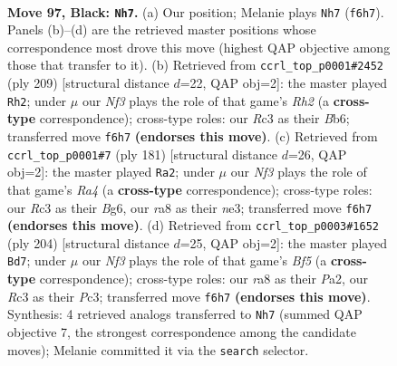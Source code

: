 \documentclass[11pt]{article}
\begin{document}
\clearpage

\begin{figure}[p]\centering
\begin{subfigure}{0.46\textwidth}\centering
\resizebox{\linewidth}{!}{%
\newchessgame
\chessboard[
  setfen={R7/8/1K3n1p/4p3/3p2kb/2r5/8/8 b - - 13 97},
  showmover=false,
  pgfstyle=straightmove, color=movearrow, markmove={f6-h7}
]}
\caption{}
\end{subfigure}\hfill
\begin{subfigure}{0.46\textwidth}\centering
\resizebox{\linewidth}{!}{%
\newchessgame
\chessboard[
  setfen={8/p5kr/1b2B3/8/4K3/8/8/5R2 b - - 5 105},
  showmover=false,
  pgfstyle=straightmove, color=movearrow, markmove={h7-h2}
]}
\caption{}
\end{subfigure}
\\[4pt]
\begin{subfigure}{0.46\textwidth}\centering
\resizebox{\linewidth}{!}{%
\newchessgame
\chessboard[
  setfen={8/5p2/6b1/rk6/8/4N3/8/2R3K1 b - - 5 91},
  showmover=false,
  pgfstyle=straightmove, color=movearrow, markmove={a5-a2}
]}
\caption{}
\end{subfigure}\hfill
\begin{subfigure}{0.46\textwidth}\centering
\resizebox{\linewidth}{!}{%
\newchessgame
\chessboard[
  setfen={8/2n5/8/p1k2B2/8/2P5/P1K5/8 w - - 79 103},
  showmover=false,
  pgfstyle=straightmove, color=movearrow, markmove={f5-d7}
]}
\caption{}
\end{subfigure}
\caption{\textbf{Move 97, Black: \texttt{Nh7}.} (a) Our position; Melanie plays \texttt{Nh7} (\texttt{f6h7}). Panels (b)--(d) are the retrieved master positions whose correspondence most drove this move (highest QAP objective among those that transfer to it). (b) Retrieved from \texttt{ccrl\_top\_p0001\#2452} (ply 209) [structural distance $d$=22, QAP obj=2]: the master played \texttt{Rh2}; under $\mu$ our \emph{Nf3} plays the role of that game's \emph{Rh2} (a \textbf{cross-type} correspondence); cross-type roles: our \emph{R}c3 as their \emph{B}b6; transferred move \texttt{f6h7} \textbf{(endorses this move)}. (c) Retrieved from \texttt{ccrl\_top\_p0001\#7} (ply 181) [structural distance $d$=26, QAP obj=2]: the master played \texttt{Ra2}; under $\mu$ our \emph{Nf3} plays the role of that game's \emph{Ra4} (a \textbf{cross-type} correspondence); cross-type roles: our \emph{R}c3 as their \emph{B}g6, our \emph{r}a8 as their \emph{n}e3; transferred move \texttt{f6h7} \textbf{(endorses this move)}. (d) Retrieved from \texttt{ccrl\_top\_p0003\#1652} (ply 204) [structural distance $d$=25, QAP obj=2]: the master played \texttt{Bd7}; under $\mu$ our \emph{Nf3} plays the role of that game's \emph{Bf5} (a \textbf{cross-type} correspondence); cross-type roles: our \emph{r}a8 as their \emph{P}a2, our \emph{R}c3 as their \emph{P}c3; transferred move \texttt{f6h7} \textbf{(endorses this move)}. Synthesis: 4 retrieved analogs transferred to \texttt{Nh7} (summed QAP objective 7, the strongest correspondence among the candidate moves); Melanie committed it via the \texttt{search} selector.}
\label{fig:thought-m193}
\end{figure}
\end{document}
